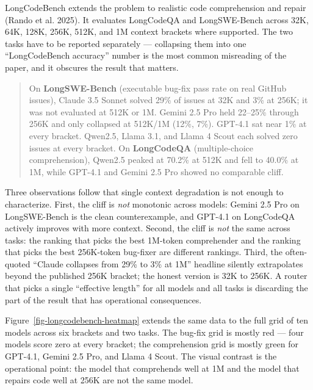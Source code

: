 \documentclass[
  11pt,
  letterpaper,
  numbers=noendperiod,
  parskip=half]{scrartcl}
\begin{document}
LongCodeBench extends the problem to realistic code comprehension and
repair (Rando et al. 2025). It evaluates LongCodeQA and LongSWE-Bench
across 32K, 64K, 128K, 256K, 512K, and 1M context brackets where
supported. The two tasks have to be reported separately --- collapsing
them into one ``LongCodeBench accuracy'' number is the most common
misreading of the paper, and it obscures the result that matters.

\begin{quote}
On \textbf{LongSWE-Bench} (executable bug-fix pass rate on real GitHub
issues), Claude 3.5 Sonnet solved 29\% of issues at 32K and 3\% at 256K;
it was not evaluated at 512K or 1M. Gemini 2.5 Pro held 22--25\% through
256K and only collapsed at 512K/1M (12\%, 7\%). GPT-4.1 sat near 1\% at
every bracket. Qwen2.5, Llama 3.1, and Llama 4 Scout each solved zero
issues at every bracket. On \textbf{LongCodeQA} (multiple-choice
comprehension), Qwen2.5 peaked at 70.2\% at 512K and fell to 40.0\% at
1M, while GPT-4.1 and Gemini 2.5 Pro showed no comparable cliff.
\end{quote}

\figureLongContextDegradation

Three observations follow that single context degradation is not enough
to characterize. First, the cliff is \emph{not} monotonic across models:
Gemini 2.5 Pro on LongSWE-Bench is the clean counterexample, and GPT-4.1
on LongCodeQA actively improves with more context. Second, the cliff is
\emph{not} the same across tasks: the ranking that picks the best
1M-token comprehender and the ranking that picks the best 256K-token
bug-fixer are different rankings. Third, the often-quoted ``Claude
collapses from 29\% to 3\% at 1M'' headline silently extrapolates beyond
the published 256K bracket; the honest version is 32K to 256K. A router
that picks a single ``effective length'' for all models and all tasks is
discarding the part of the result that has operational consequences.

Figure~\ref{fig-longcodebench-heatmap} extends the same data to the full
grid of ten models across six brackets and two tasks. The bug-fix grid is
mostly red --- four models score zero at every bracket; the comprehension
grid is mostly green for GPT-4.1, Gemini 2.5 Pro, and Llama 4 Scout. The
visual contrast is the operational point: the model that comprehends well
at 1M and the model that repairs code well at 256K are not the same model.

\figureLongCodeBenchHeatmap
\end{document}

